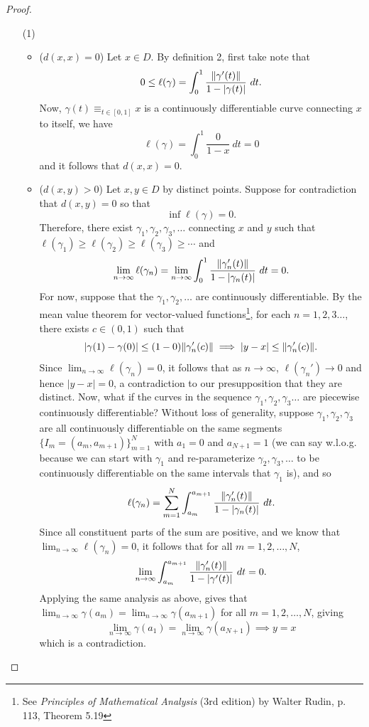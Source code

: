 \documentclass[10pt]{article}
\theoremstyle{plain}
\begin{document}
		\begin{proof} ~
			\begin{itemize}
				\item[(1)] ~
					\begin{itemize}
						\item ($d(x, x) = 0$) Let $x \in D$. By definition 2, first take note that $$0 \leq \ell(\gamma) = \int_0^1 \frac{\norm{\gamma'(t)}}{1 - |\gamma(t)|} \ dt.$$ Now, $\gamma(t) \equiv_{t \in [0, 1]} x$ is a continuously differentiable curve connecting $x$ to itself, we have $$\ell(\gamma) = \int_0^1 \frac{0}{1 - x} \ dt = 0$$ and it follows that $d(x, x) = 0$.
						
						\item ($d(x, y) > 0$) Let $x, y \in D$ by distinct points. Suppose for contradiction that $d(x, y) = 0$ so that $$\inf \ell(\gamma) = 0.$$ Therefore, there exist $\gamma_1, \gamma_2, \gamma_3, \dots$ connecting $x$ and $y$ such that $\ell(\gamma_1) \geq \ell(\gamma_2) \geq \ell(\gamma_3) \geq \cdots$ and $$\lim_{n \to \infty} \ell(\gamma_n) =  \lim_{n \to \infty} \int_0^1 \frac{\norm{\gamma_n'(t)}}{1 - |\gamma_n(t)|} \ dt= 0.$$ For now, suppose that the $\gamma_1, \gamma_2, \dots$ are continuously differentiable. By the mean value theorem for vector-valued functions\footnote{See \textit{Principles of Mathematical Analysis} (3rd edition) by Walter Rudin, p. 113, Theorem 5.19}, for each $n = 1, 2, 3 \dots$, there exists $c \in (0, 1)$ such that $$|\gamma(1) - \gamma(0)| \leq (1 - 0)\norm{\gamma_n'(c)} \implies |y - x| \leq \norm{\gamma_n'(c)}.$$  Since $\lim_{n \to \infty} \ell(\gamma_n) = 0$, it follows that as $n \to \infty$, $\ell(\gamma_n') \to 0$ and hence $|y - x| = 0$, a contradiction to our presupposition that they are distinct. Now, what if the curves in the sequence $\gamma_1, \gamma_2, \gamma_3 \dots$ are piecewise continuously differentiable? Without loss of generality, suppose $\gamma_1, \gamma_2, \gamma_3$ are all continuously differentiable on the same segments $\{I_m = (a_m, a_{m + 1})\}_{m = 1}^N$ with $a_1 = 0$ and $a_{N + 1} = 1$ (we can say w.l.o.g. because we can start with $\gamma_1$ and re-parameterize $\gamma_2, \gamma_3, \dots$ to be continuously differentiable on the same intervals that $\gamma_1$ is), and so $$\ell(\gamma_n) = \sum_{m = 1}^N \int_{a_m}^{a_{m + 1}} \frac{\norm{\gamma_n'(t)}}{1 - |\gamma_n(t)|} \ dt.$$ Since all constituent parts of the sum are positive, and we know that $\lim_{n \to \infty} \ell(\gamma_n) = 0$, it follows that for all $m = 1, 2, \dots, N$, $$\lim_{n \to \infty} \int_{a_m}^{a_{m + 1}} \frac{\norm{\gamma_n'(t)}}{1 - |\gamma'(t)|} \ dt = 0.$$ Applying the same analysis as above, gives that $\lim_{n \to \infty} \gamma(a_m) = \lim_{n \to \infty} \gamma(a_{m + 1})$ for all $m = 1, 2, \dots, N$, giving $$ \lim_{n \to \infty} \gamma(a_1) = \lim_{n \to \infty} \gamma(a_{N + 1}) \implies y = x$$ which is a contradiction.  
						

\end{itemize}
\end{itemize}
\end{proof}
\end{document}
